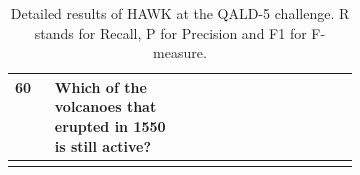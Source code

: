 \begin{longtable}{@{}lp{0.4\linewidth}lllllllll@{}}
60       & Which of the volcanoes that erupted in 1550 is still active?                                                & \cellcolor[HTML]{BBDAFF}    & \cellcolor[HTML]{BBDAFF}     & \cellcolor[HTML]{BBDAFF}     & \cellcolor[HTML]{BBDAFF}  & \cellcolor[HTML]{BBDAFF}  & \cellcolor[HTML]{BBDAFF}  & \cellcolor[HTML]{BBDAFF} & \cellcolor[HTML]{BBDAFF} & \cellcolor[HTML]{BBDAFF} \\ \bottomrule


\caption{Detailed results of HAWK at the QALD-5 challenge. R stands for Recall, P for Precision and F1 for F-measure.}
\label{tab:eval_qal5_detail}
\end{longtable}
